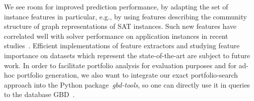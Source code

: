 \documentclass[a4paper,USenglish,pdfa]{lipics-v2021} %
\begin{document}
We see room for improved prediction performance, by adapting the set of instance features in particular,
e.g., by using features describing the community structure of graph representations of SAT instances.
Such new features have correlated well with solver performance on application instances in recent studies~\cite{Ansotegui:2009:StructureIndustrial,Ansotegui:2017:StructureFeatures,Ansotegui:2019:CommunityStructure,Li:2021:HCS}. 
Efficient implementations of feature extractors and studying feature importance on datasets which represent the state-of-the-art are subject to future work. 
In order to facilitate portfolio analysis for evaluation purposes and for ad-hoc portfolio generation, we also want to integrate our exact portfolio-search approach into the Python package~\emph{gbd-tools}, so one can directly use it in queries to the database GBD~\cite{iser2020collaborative}. 


\end{document}
